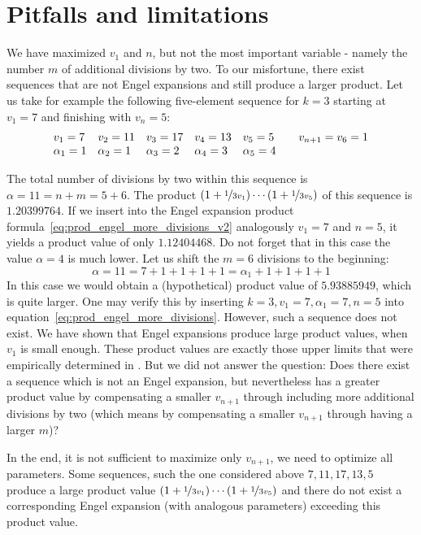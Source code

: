 \documentclass[12pt]{amsart}
\theoremstyle{definition}
\begin{document}
\section{Pitfalls and limitations}
We have maximized $v_1$ and $n$, but not the most important variable - namely the number $m$ of additional divisions by two. To our misfortune, there exist sequences that are not Engel expansions and still produce a larger product. Let us take for example the following five-element sequence for $k=3$ starting at $v_1=7$ and finishing with $v_{n}=5$:
\[
\begin{array}{l@{\hspace{1em}}l@{\hspace{1em}}l@{\hspace{1em}}l@{\hspace{1em}}l@{\hspace{2em}}l}
v_1=7&v_2=11&v_3=17&v_4=13&v_5=5&v_{n+1}=v_6=1\\
\alpha_1=1&\alpha_2=1&\alpha_3=2&\alpha_4=3&\alpha_5=4&
\end{array}
\]

The total number of divisions by two within this sequence is $\alpha=11=n+m=5+6$. The product $(1+\nicefrac{1}{3v_1})\cdots(1+\nicefrac{1}{3v_5})$ of this sequence is $1.20399764$. If we insert into the Engel expansion product formula~\ref{eq:prod_engel_more_divisions_v2} analogously $v_1=7$ and $n=5$, it yields a product value of only $1.12404468$. Do not forget that in this case the value $\alpha=4$ is much lower. Let us shift the $m=6$ divisions to the beginning:
\[
\alpha=11=7+1+1+1+1=\alpha_1+1+1+1+1
\]
In this case we would obtain a (hypothetical) product value of $5.93885949$, which is quite larger. One may verify this by inserting $k=3,v_1=7,\alpha_1=7,n=5$ into equation~\ref{eq:prod_engel_more_divisions}. However, such a sequence does not exist. We have shown that Engel expansions produce large product values, when $v_1$ is small enough. These product values are exactly those upper limits that were empirically determined in \cite{Ref_Koch_etal}. But we did not answer the question: Does there exist a sequence which is not an Engel expansion, but nevertheless has a greater product value by compensating a smaller $v_{n+1}$ through including more additional divisions by two (which means by compensating a smaller $v_{n+1}$ through having a larger $m$)?

\par\medskip
In the end, it is not sufficient to maximize only $v_{n+1}$, we need to optimize all parameters. Some sequences, such the one considered above $7,11,17,13,5$ produce a large product value $(1+\nicefrac{1}{3v_1})\cdots(1+\nicefrac{1}{3v_5})$ and there do not exist a corresponding Engel expansion (with analogous parameters) exceeding this product value.
\end{document}
